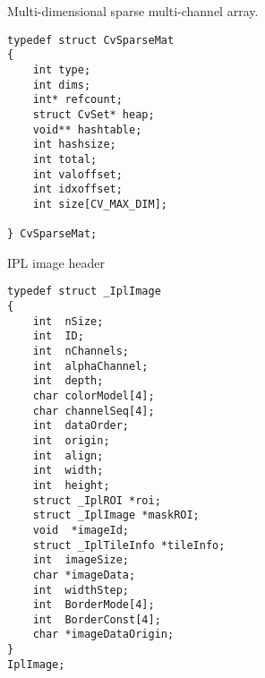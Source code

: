 \ifC
\label{CvSparseMat}
Multi-dimensional sparse multi-channel array.

\begin{lstlisting}
typedef struct CvSparseMat
{
    int type;
    int dims; 
    int* refcount; 
    struct CvSet* heap; 
    void** hashtable; 
    int hashsize;
    int total; 
    int valoffset; 
    int idxoffset; 
    int size[CV_MAX_DIM]; 

} CvSparseMat;
\end{lstlisting}

\begin{description}
\end{description}

\fi

\label{IplImage}
\ifC
IPL image header

\begin{lstlisting}
typedef struct _IplImage
{
    int  nSize;         
    int  ID;            
    int  nChannels;     
    int  alphaChannel;  
    int  depth;         
    char colorModel[4]; 
    char channelSeq[4]; 
    int  dataOrder;     
    int  origin;        
    int  align;         
    int  width;         
    int  height;        
    struct _IplROI *roi; 
    struct _IplImage *maskROI; 
    void  *imageId;     
    struct _IplTileInfo *tileInfo; 
    int  imageSize;                             
    char *imageData;  
    int  widthStep;   
    int  BorderMode[4]; 
    int  BorderConst[4]; 
    char *imageDataOrigin; 
}
IplImage;
\end{lstlisting}

